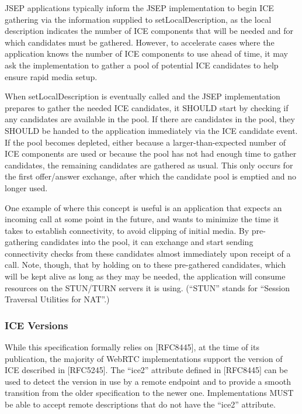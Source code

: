 \documentclass{article}
\begin{document}
JSEP applications typically inform the JSEP implementation to begin
ICE gathering via the information supplied to setLocalDescription, as
the local description indicates the number of ICE components that
will be needed and for which candidates must be gathered.  However,
to accelerate cases where the application knows the number of ICE
components to use ahead of time, it may ask the implementation to
gather a pool of potential ICE candidates to help ensure rapid media
setup.

When setLocalDescription is eventually called and the JSEP
implementation prepares to gather the needed ICE candidates, it
SHOULD start by checking if any candidates are available in the pool.
If there are candidates in the pool, they SHOULD be handed to the
application immediately via the ICE candidate event.  If the pool
becomes depleted, either because a larger-than-expected number of ICE
components are used or because the pool has not had enough time to
gather candidates, the remaining candidates are gathered as usual.
This only occurs for the first offer/answer exchange, after which the
candidate pool is emptied and no longer used.

One example of where this concept is useful is an application that
expects an incoming call at some point in the future, and wants to
minimize the time it takes to establish connectivity, to avoid
clipping of initial media.  By pre-gathering candidates into the
pool, it can exchange and start sending connectivity checks from
these candidates almost immediately upon receipt of a call.  Note,
though, that by holding on to these pre-gathered candidates, which
will be kept alive as long as they may be needed, the application
will consume resources on the STUN/TURN servers it is using.  (``STUN''
stands for ``Session Traversal Utilities for NAT''.)

\subsubsection{ICE Versions}

While this specification formally relies on [RFC8445], at the time of
its publication, the majority of WebRTC implementations support the
version of ICE described in [RFC5245].  The ``ice2'' attribute defined
in [RFC8445] can be used to detect the version in use by a remote
endpoint and to provide a smooth transition from the older
specification to the newer one.  Implementations MUST be able to
accept remote descriptions that do not have the ``ice2'' attribute.
\end{document}
